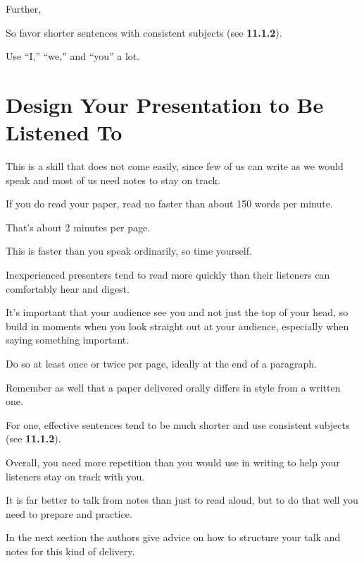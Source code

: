 \documentclass[oneside]{book}
\numberwithin{equation}{section}
\begin{document}

Further, 

So favor shorter sentences with consistent subjects (see \textbf{11.1.2}).

Use ``I,'' ``we,'' and ``you'' a lot.


\section{Design Your Presentation to Be Listened To}

This is a skill that does not come easily, since few of us can write as we would speak and most of us need notes to stay on track.

If you do read your paper, read no faster than about 150 words per minute.

That's about 2 minutes per page.

This is faster than you speak ordinarily, so time yourself.

Inexperienced presenters tend to read more quickly than their listeners can comfortably hear and digest.

%
It's important that your audience see you and not just the top of your head, so build in moments when you look straight out at your audience, especially when saying something important.

Do so at least once or twice per page, ideally at the end of a paragraph.

%
Remember as well that a paper delivered orally differs in style from a written one.

For one, effective sentences tend to be much shorter and use consistent subjects (see \textbf{11.1.2}).

Overall, you need more repetition than you would use in writing to help your listeners stay on track with you.

%
It is far better to talk from notes than just to read aloud, but to do that well you need to prepare and practice.

In the next section the authors give advice on how to structure your talk and notes for this kind of delivery.
\end{document}
